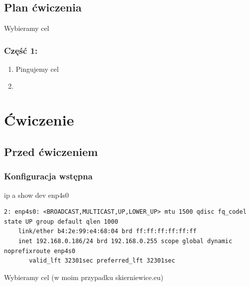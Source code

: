 \documentclass[11pt]{article}
\begin{document}
\subsection{Plan ćwiczenia}
\label{sec:org99ded43}
Wybieramy cel


\subsubsection{Część 1:}
\label{sec:org61d55d1}
\begin{enumerate}
\item Pingujemy cel
\item 
\end{enumerate}



\section{Ćwiczenie}
\label{sec:org4d3434a}
\subsection{Przed ćwiczeniem}
\label{sec:orga312abf}
\subsubsection{Konfiguracja wstępna}
\label{sec:org0aec1fe}
ip a show dev enp4s0
\begin{verbatim}
2: enp4s0: <BROADCAST,MULTICAST,UP,LOWER_UP> mtu 1500 qdisc fq_codel state UP group default qlen 1000
    link/ether b4:2e:99:e4:68:04 brd ff:ff:ff:ff:ff:ff
    inet 192.168.0.186/24 brd 192.168.0.255 scope global dynamic noprefixroute enp4s0
       valid_lft 32301sec preferred_lft 32301sec
\end{verbatim}
Wybieramy cel (w moim przypadku skierniewice.eu)
\end{document}
